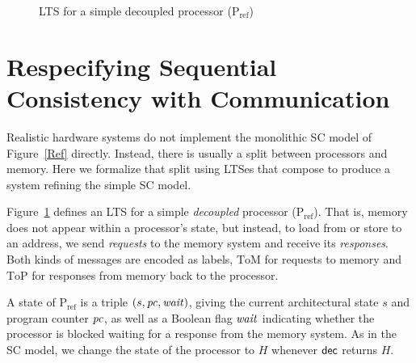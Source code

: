 \begin{figure}
\small
\centering
{}

\caption{LTS for a simple decoupled processor (P$_{\text{ref}}$)}
\label{Pref$}
\end{figure}


\section{Respecifying Sequential Consistency with Communication}\label{sec:ref}

Realistic hardware systems do not implement the monolithic SC model of
Figure~\ref{Ref} directly.  Instead, there is usually a split between
processors and memory. Here we formalize that split using LTSes that 
compose to produce a system refining the simple SC model.

Figure~\ref{Pref$} defines an LTS for a simple \emph{decoupled} processor
(P$_\text{ref}$).  That is, memory does not appear within a processor's state, but
instead, to load from or store to an address, we send \emph{requests} to the
memory system and receive its \emph{responses}.  Both kinds of messages are
encoded as labels, $\text{ToM}$ for requests to memory and $\text{ToP}$ for
responses from memory back to the processor.

A state of P$_{\text{ref}}$ is a triple $(s, \mathit{pc}, \mathit{wait})$, giving the current architectural
state $s$ and program counter $\mathit{pc}$, as well as a Boolean flag $\mathit{wait}$
indicating whether the processor is blocked waiting for a response from the
memory system. As in the SC model, we change the state of the processor to $H$
whenever $\mathsf{dec}$ returns $H$. 

